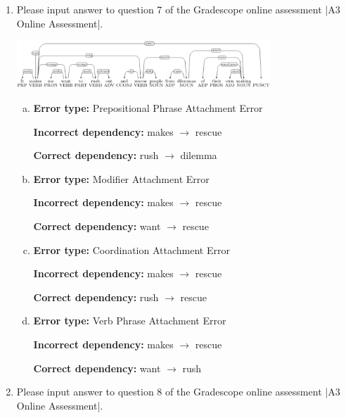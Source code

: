 \begin{enumerate}[1.]
\begin{enumerate}[(a)]
{\bf Incorrect dependency:} wedding $\rightarrow$ fearing

{\bf Correct dependency:} heading $\rightarrow$ death OR I $\rightarrow$ death

\end{enumerate}


\item {} Please input answer to question 7 of the Gradescope online assessment |A3 Online Assessment|.

\begin{center}
\includegraphics[width=0.75\textwidth]{7-1.png}
\end{center}

\begin{enumerate}[(a)]
\item {\bf Error type:} Prepositional Phrase Attachment Error

{\bf Incorrect dependency:} makes $\rightarrow$ rescue 

{\bf Correct dependency:} rush $\rightarrow$ dilemma

\item {\bf Error type:} Modifier Attachment Error

{\bf Incorrect dependency:} makes $\rightarrow$ rescue

{\bf Correct dependency:} want $\rightarrow$ rescue

\item {\bf Error type:} Coordination Attachment Error 

{\bf Incorrect dependency:} makes $\rightarrow$ rescue 

{\bf Correct dependency:} rush $\rightarrow$ rescue

\item {\bf Error type:} Verb Phrase Attachment Error

{\bf Incorrect dependency:} makes $\rightarrow$ rescue

{\bf Correct dependency:} want $\rightarrow$ rush

\end{enumerate}


\item {} Please input answer to question 8 of the Gradescope online assessment |A3 Online Assessment|.


\end{enumerate}
